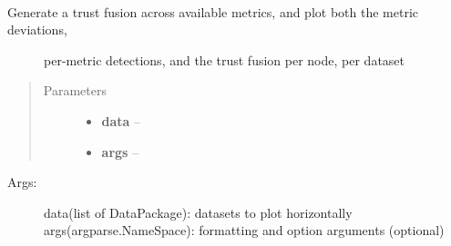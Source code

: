 \documentclass[letterpaper,10pt,english]{sphinxmanual}
\begin{document}

\begin{fulllineitems}
\label{index:bounos.run_detection_fusion}~\begin{description}
\item[{Generate a trust fusion across available metrics, and plot both the metric deviations,}] \leavevmode
per-metric detections, and the trust fusion per node, per dataset

\end{description}
\begin{quote}\begin{description}
\item[{Parameters}] \leavevmode\begin{itemize}
\item {} 
\textbf{data} -- 

\item {} 
\textbf{args} -- 

\end{itemize}

\end{description}\end{quote}
\begin{description}
\item[{Args:}] \leavevmode
data(list of DataPackage): datasets to plot horizontally
args(argparse.NameSpace): formatting and option arguments (optional)

\end{description}

\end{fulllineitems}

\end{document}
